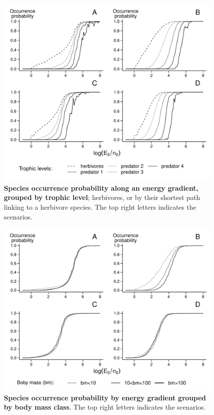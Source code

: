 \begin{figure}[htbp]
\centering
\includegraphics{chapitre4/fig/fig2.pdf}
\caption{\textbf{Species occurrence probability along an energy
gradient, grouped by trophic level}; herbivores, or by their shortest
path linking to a herbivore species. The top right letters indicates the
scenarios.\label{fig:etib2}}
\end{figure}

\begin{figure}[htbp]
\centering
\includegraphics{chapitre4/fig/fig3.pdf}
\caption{\textbf{Species occurrence probability by energy gradient
grouped by body mass class}. The top right letters indicates the
scenarios.\label{fig:etib3}}
\end{figure}

